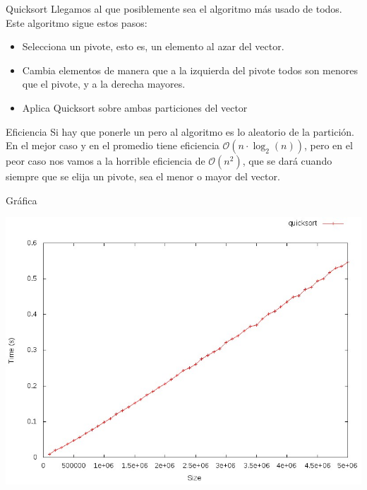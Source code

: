 \documentclass[compress]{beamer}
\begin{document}
\begin{frame}{Quicksort}
Llegamos al que posiblemente sea el algoritmo más usado de todos. Este algoritmo sigue estos pasos:\\
\vspace{0.20in}
	\begin{itemize}
	\item Selecciona un pivote, esto es, un elemento al azar del vector.
	\item Cambia elementos de manera que a la izquierda del pivote todos son menores que el pivote, y a la derecha mayores.
	\item Aplica Quicksort sobre ambas particiones del vector
	\end{itemize}
\vspace{0.20in}
	\begin{block}{Eficiencia}
	Si hay que ponerle un pero al algoritmo es lo aleatorio de la partición. En el mejor caso y en el promedio tiene eficiencia $\mathcal{O}(n\cdot\log_2(n))$, pero en el peor caso nos vamos a la horrible eficiencia de $\mathcal{O}(n^2)$, que se dará cuando siempre que se elija un pivote, sea el menor o mayor del vector.
	\end{block}
\end{frame}

\begin{frame}{Gráfica}
	\begin{alertblock}{}
		\begin{center}
		\includegraphics[scale=0.40]{images/quicksort.jpeg}
		\end{center}
	\end{alertblock}
\end{frame}
\end{document}
